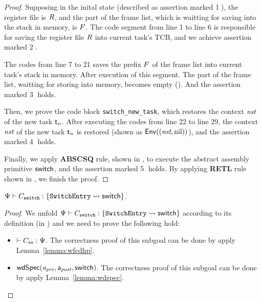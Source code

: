 \begin{proof}
    Supposing in the inital state (described as assertion marked 
    {\color{red} \textcircled{1}}), 
    the register file is $R$, 
    and the part of the frame list, which is waitting for saving into 
    the stack in memory, is $F$. The code segment 
    from line 1 to line 6 is responsible for saving the register file  
    $R$ into current task's TCB, and we achieve assertion 
    marked {\color{red} \textcircled{2}}. 

    The codes from line 7 to 21 saves the prefix $F$ of the 
    frame list into current task's stack in memory. After execution 
    of this segment. The part of the frame list, waitting for storing 
    into memory, becomes empty (\nil). And the assertion marked
    {\color{red} \textcircled{3}} holds.  

    Then, we prove the code block \texttt{switch\_new\_task}, which 
    restores the context $\textit{nst}$ of the new task $\textsf{t}_n$. After 
    executing the codes from line 22 to line 29, the context $\textit{nst}$ of 
    the new task $\textsf{t}_n$ is restored (shown as $\mathsf{Env}({(\textit{nst}, \text{nil})})$), 
    and the assertion marked {\color{red} \textcircled{4}} holds. 

    Finally, we apply \textbf{ABSCSQ} rule, shown in 
    \Fig{\ref{fig:Selected Inference Rules for Refinement Verification}}, 
    to execute the abstract assembly primitive $\mathsf{switch}{}$, and the 
    assertion marked {\color{red} \textcircled{5}} holds. 
    By applying \textbf{RETL} rule shown in 
    \Fig{\ref{fig:Selected Inference Rules for Refinement Verification}}, 
    we finish the proof. 
\end{proof}

\begin{theorem}
    \em
    ${\Psi} \vdash {C_{\texttt{switch}}} : {\{\texttt{SwitchEntry}\rightsquigarrow \mathsf{switch}\}}$. 
\end{theorem}
\begin{proof}
    We unfold 
    ${\Psi} \vdash {C_{\texttt{switch}}} : {\{ \texttt{SwitchEntry}\leadsto \mathsf{switch} \}}$ 
    according to its definition 
    (in \Fig{\ref{fig:Selected Inference Rules for Refinement Verification}}) 
    and we need to prove the following hold:
    \begin{itemize}
        \item $\vdash {C_{\text{as}}} : {\Psi{}}$. \quad 
            The correctness proof of this subgoal can be done by 
            apply Lemma~\ref{lemma:wfcdhp}. 
        \item $\textsf{wdSpec}({\textit{a}_\textit{pre}}, {\mathsf{a}_{\textit{post}}}, {\mathsf{switch}})$. \quad
            The correctness proof of this subgoal can be done by 
            apply Lemma~\ref{lemma:wdspec}.
    \end{itemize}
\end{proof}

